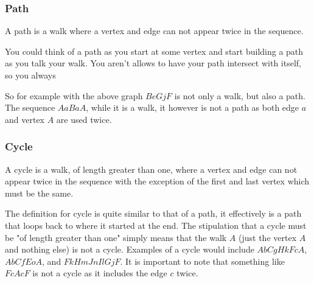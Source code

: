 \documentclass{article}
\begin{document}
\subsubsection{Path}
\begin{definition}[path]
	A path is a walk where a vertex and edge can not appear twice in the sequence.
\end{definition}
 
You could think of a path as you start at some vertex and start building a path as you talk your walk. You aren't allows to have your path intersect with itself, so you always 
 
So for example with the above graph $BeGjF$ is not only a walk, but also a path. The sequence $AaBaA$, while it is a walk, it however is not a path as both edge $a$ and vertex $A$ are used twice.

\subsubsection{Cycle}
\begin{definition}[cycle]
	A cycle is a walk, of length greater than one, where a vertex and edge can not appear twice in the sequence with the exception of the first and last vertex which must be the same.
\end{definition}


The definition for cycle is quite similar to that of a path, it effectively is a path that loops back to where it started at the end. The stipulation that a cycle must be "of length greater than one" simply means that the walk $A$ (just the vertex $A$ and nothing else) is not a cycle. Examples of a cycle would include $AbCgHkFcA$, $AbCfEoA$, and $FkHmJnIlGjF$. It is important to note that something like $FcAcF$ is not a cycle as it includes the edge $c$ twice.
\end{document}
